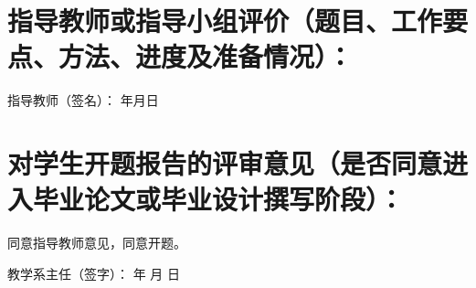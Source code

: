 \documentclass{cdutproposal}
\begin{document}
\section{指导教师或指导小组评价（题目、工作要点、方法、进度及准备情况）：}
\vspace{5cm}
\quad\quad \quad\quad\quad \quad\quad\quad 指导教师（签名）：   \quad\quad\quad \quad\quad\quad      \quad\quad\quad                    年\quad\quad 月\quad\quad 日
\hruleinbox
\section{对学生开题报告的评审意见（是否同意进入毕业论文或毕业设计撰写阶段）：}
\vspace{0.5cm}

\quad\quad \quad\quad	同意指导教师意见，同意开题。

\vspace{2.5cm}

\quad\quad \quad\quad\quad \quad\quad\quad 教学系主任（签字）：    \quad\quad\quad \quad\quad\quad      \quad\quad                      年  \quad\quad 月 \quad\quad  日
\end{document}

